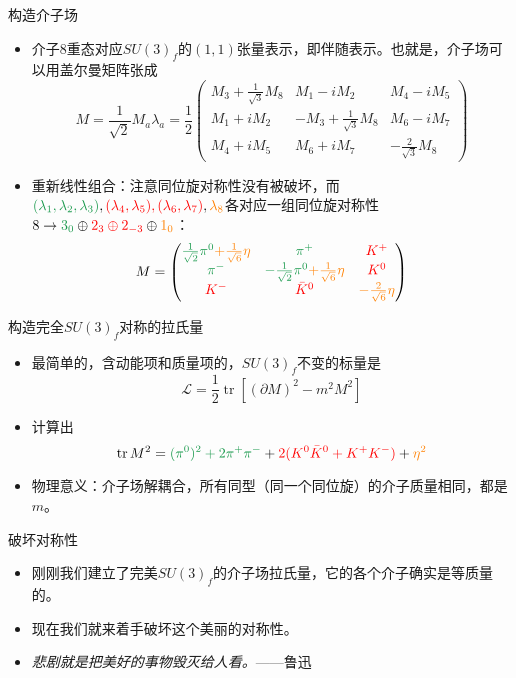 \documentclass[aspectratio=1610,14pt,mathserif]{beamer}
\DeclareMathOperator{\tr}{tr}
\newcommand{\lag}{\mathcal{L}}
\newcommand{\mat}[1]{\begin{pmatrix}#1\end{pmatrix}}
\newcommand{\red}[1]{{\color{red} #1}}
\def\green#1{{\color[rgb]{0.1,0.6,0.3}#1}}
\newcommand{\orange}[1]{{\color{orange} #1}}
\begin{document}
\begin{frame}{构造介子场}
\begin{itemize}
\item
介子8重态对应$SU(3)_f$的$(1,1)$张量表示，即伴随表示。也就是，介子场可以用盖尔曼矩阵张成
$$
M = \frac{1}{\sqrt 2} M_a \lambda_a = \frac{1}{2} \mat{ M_3 + \frac{1}{\sqrt 3} M_8 & M_1 - iM_2 & M_4 - iM_5 \\
M_1 + iM_2 & -M_3 + \frac{1}{\sqrt 3} M_8 & M_6 - iM_7 \\ M_4 + iM_5 & M_6 + iM_7 & -\frac{2}{\sqrt 3} M_8 }
$$
\item 重新线性组合：注意同位旋对称性没有被破坏，而$\green{(\lambda_{1},\lambda_2,\lambda_3)},\red{(\lambda_4,\lambda_5),(\lambda_6,\lambda_7)},\orange{\lambda_8}$各对应一组同位旋对称性$8 \to \green{3_0} \oplus \red{2_3 \oplus 2_{-3} }\oplus \orange{1_0}$：
$$
M = \mat{\green{\frac{1}{\sqrt 2} \pi^0 }\orange{+ \frac{1}{\sqrt 6} \eta} &\green{ \pi^+} & \red{K^+} \\
\green{ \pi^- }& \green{- \frac{1}{\sqrt 2} \pi^0 }\orange{+ \frac{1}{\sqrt 6} \eta } & \red{K^0} \\
\red{ K^- }& \red{\bar{K}^0}  & \orange{- \frac{2}{\sqrt 6} \eta}}
$$

\end{itemize}
\end{frame}

\begin{frame}{构造完全$SU(3)_f$对称的拉氏量}
\begin{itemize}
\item 最简单的，含动能项和质量项的，$SU(3)_f$不变的标量是
$$
\lag = \frac{1}{2}\tr \left[(\partial M)^2 - m^2 M^2 \right]
$$
\item 计算出$$\tr M^2 =\green{ (\pi^0)^2 + 2\pi^+ \pi^- } + \red{2(K^0 \bar{K}^0 + K^+ K^-)} + \orange{\eta^2}$$
\item 物理意义：介子场解耦合，所有同型（同一个同位旋）的介子质量相同，都是$m$。
\end{itemize}
\end{frame}

\begin{frame}{破坏对称性}
\begin{itemize}
\item 刚刚我们建立了完美$SU(3)_f$的介子场拉氏量，它的各个介子确实是等质量的。
\item 现在我们就来着手破坏这个美丽的对称性。
\item \emph{悲剧就是把美好的事物毁灭给人看。}——鲁迅
\end{itemize}
\end{frame}
\end{document}

